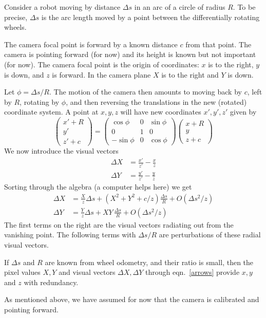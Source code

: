 \documentclass[12pt]{article}
\begin{document}
\noindent Consider a robot moving by distance $\Delta s$ in an arc of a
circle of radius $R$.  To be precise, $\Delta s$ is the arc length
moved by a point between the differentially rotating wheels.

The camera focal point is forward by a known distance $c$ from that
point.  The camera is pointing forward (for now) and its height is
known but not important (for now).  The camera focal point is the
origin of coordinates: $x$ is to the right, $y$ is down, and $z$ is
forward.  In the camera plane $X$ is to the right and $Y$ is down.

Let $\phi=\Delta s/R$.  The motion of the camera then amounts to
moving back by $c$, left by $R$, rotating by $\phi$, and then
reversing the translations in the new (rotated) coordinate system.  A
point at $x,y,z$ will have new coordinates $x',y',z'$ given by
\begin{equation}
  \begin{pmatrix} x' + R \\ y' \\ z' + c \end{pmatrix} =
  \begin{pmatrix}
    \cos\phi & 0 & \sin\phi \\
    0        & 1 & 0 \\
   -\sin\phi & 0 & \cos\phi
  \end{pmatrix}
  \begin{pmatrix} x  + R \\ y \\ z  + c \end{pmatrix}
\end{equation}
We now introduce the visual vectors
\begin{equation}
\begin{aligned}
  \Delta X &= \frac{x'}{z'}-\frac xz \\
  \Delta Y &= \frac{y'}{z'}-\frac yz
\end{aligned}
\end{equation}
Sorting through the algebra (a computer helps here) we get
\begin{equation}\label{arrows}
\begin{aligned}
  \Delta X &= \frac Xz \Delta s + (X^2+Y^2 + c/z) \frac{\Delta s}R
  + O\left(\Delta s^2/z\right) \\
  \Delta Y &= \frac Yz \Delta s + XY \,\frac{\Delta s}R
  + O\left(\Delta s^2/z\right)
\end{aligned}
\end{equation}
The first terms on the right are the visual vectors radiating out from
the vanishing point.  The following terms with $\Delta s/R$ are
perturbations of these radial visual vectors.

If $\Delta s$ and $R$ are known from wheel odometry, and their ratio
is small, then the pixel values $X,Y$ and visual vectors
$\Delta X,\Delta Y$
through eqn.~\eqref{arrows} provide $x,y$ and $z$ with redundancy.

As mentioned above, we have assumed for now that the camera is
calibrated and pointing forward.
\end{document}
